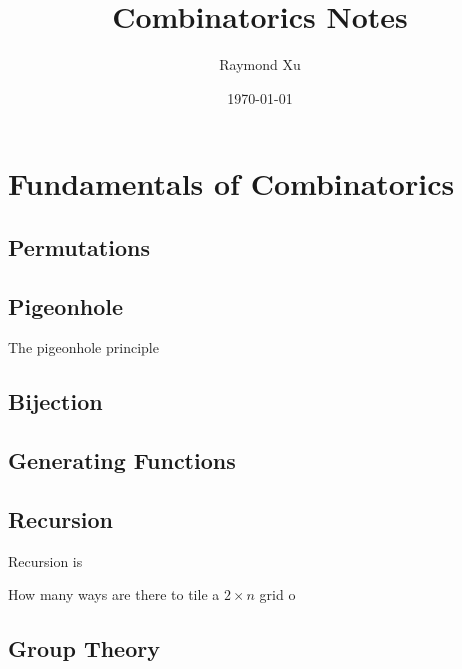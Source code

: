 \documentclass[11pt]{scrartcl}
\theoremstyle{plain} %
\theoremstyle{definition}
\theoremstyle{remark}
\theoremstyle{empty}
\theoremstyle{empty}
\theoremstyle{empty}
\theoremstyle{empty}
\theoremstyle{empty}
\theoremstyle{empty}
\begin{document}



\title{Combinatorics Notes}
\author{Raymond Xu}
\date{\today}
\maketitle

\begin{abstract}
\end{abstract}

\tableofcontents

\eject


\section{Fundamentals of Combinatorics}

\subsection{Permutations}

\subsection{Pigeonhole}

The pigeonhole principle

\subsection{Bijection}

\subsection{Generating Functions}

\subsection{Recursion}

Recursion is 

\begin{problem}
How many ways are there to tile a $2 \times n$ grid o
\end{problem}

\subsection{Group Theory}
\end{document}

